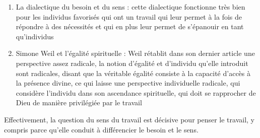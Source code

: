 \documentclass[a4paper,12pt]{book}
\begin{document}
\begin{itemize}
\begin{enumerate}
    \item La dialectique du besoin et du sens : cette dialectique fonctionne très bien pour les individus favorisés qui ont un travail qui leur permet à la fois de répondre à des nécessités et qui en plus leur permet de s'épanouir en tant qu'individus
    \item Simone Weil et l'égalité spirituelle : Weil rétablit dans son dernier article une perspective assez radicale, la notion d'égalité et d'individu qu'elle introduit sont radicales, disant que la véritable égalité consiste à la capacité d'accès à la présence divine, ce qui laisse une perspective individuelle radicale, qui considère l'individu dans son ascendance spirituelle, qui doit se rapprocher de Dieu de manière privilégiée par le travail
\end{enumerate}
\end{itemize}
Effectivement, la question du sens du travail est décisive pour penser le travail, y compris parce qu'elle conduit à différencier le besoin et le sens.
\end{document}

